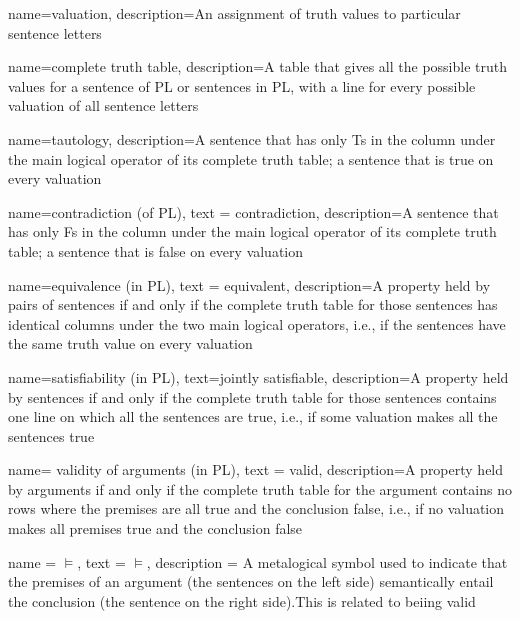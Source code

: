 {
name=valuation,
description={An assignment of \glspl{truth value} to particular \glspl{sentence letter}}
}

{
name=complete truth table,
description={A table that gives all the possible \glspl{truth value} for a \gls{sentence of PL} or sentences in PL, with a line for every possible \gls{valuation} of all sentence letters}
}

{
name=tautology,
description={A sentence that has only Ts in the column under the main logical operator of its \gls{complete truth table}; a sentence that is true on every \gls{valuation}}
}

{
  name=contradiction (of PL),
  text = contradiction,
description={A sentence that has only Fs in the column under the main logical operator of its \gls{complete truth table}; a sentence that is false on every \gls{valuation}}
}

{
  name=equivalence (in PL),
  text = equivalent,
description={A property held by pairs of sentences if and only if the \gls{complete truth table} for those sentences has identical columns under the two main logical operators, i.e., if the sentences have the same truth value on every valuation}
}

{
  name=satisfiability (in PL),
  text=jointly satisfiable,
description={A property held by sentences if and only if the \gls{complete truth table} for those sentences contains one line on which all the sentences are true, i.e., if some \gls{valuation} makes all the sentences true}
}

{
  name= validity of arguments (in PL),
  text = valid,
description={A property held by arguments if and only if the \gls{complete truth table} for the argument contains no rows where the \glspl{premise} are all true and the \gls{conclusion} false, i.e., if no \gls{valuation} makes all premises true and the conclusion false}
}

{
name = {\ensuremath{\vDash}},
text = $\vDash$,
description = {A metalogical symbol used to indicate that the premises of an argument (the sentences on the left side) semantically entail the conclusion (the sentence on the right side).This is related to beiing \gls{valid}}
} 

